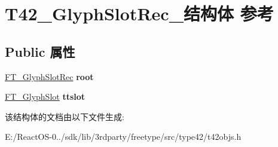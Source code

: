 \hypertarget{struct_t42___glyph_slot_rec__}{}\section{T42\+\_\+\+Glyph\+Slot\+Rec\+\_\+结构体 参考}
\label{struct_t42___glyph_slot_rec__}
\subsection*{Public 属性}
\begin{DoxyCompactItemize}
\item 
\mbox{\label{struct_t42___glyph_slot_rec___a25b76478fe1455ec081c1045e53588da}} 
\hyperlink{struct_f_t___glyph_slot_rec__}{F\+T\+\_\+\+Glyph\+Slot\+Rec} {\bfseries root}
\item 
\mbox{\label{struct_t42___glyph_slot_rec___aadd69ee963adbc1124a5c79183cccda7}} 
\hyperlink{struct_f_t___glyph_slot_rec__}{F\+T\+\_\+\+Glyph\+Slot} {\bfseries ttslot}
\end{DoxyCompactItemize}


该结构体的文档由以下文件生成\+:\begin{DoxyCompactItemize}
\item 
E\+:/\+React\+O\+S-\/0../sdk/lib/3rdparty/freetype/src/type42/t42objs.\+h\end{DoxyCompactItemize}
